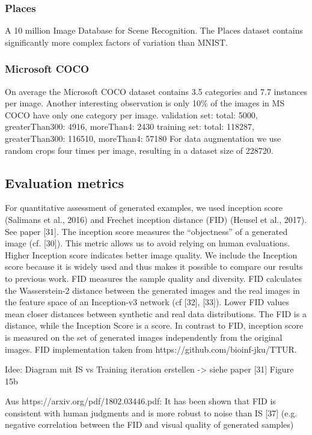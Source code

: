 \documentclass[12pt,a4paper]{article}
\begin{document}
\subsubsection{Places}
A 10 million Image Database for Scene Recognition. The Places dataset contains significantly more complex factors of variation than MNIST.

\subsubsection{Microsoft COCO}
On average the Microsoft COCO dataset \cite{1405.0312} contains 3.5 categories and 7.7 instances per image. Another interesting observation is only 10\% of the images in MS COCO have only one category per image.
validation set: total: 5000, greaterThan300: 4916, moreThan4: 2430
training set: total: 118287, greaterThan300: 116510, moreThan4: 57180
For data augmentation we use random crops four times per image, resulting in a dataset size of 228720.
    
\subsection{Evaluation metrics}
For quantitative assessment of generated examples, we used inception score (Salimans et al., 2016)
and Frechet inception distance (FID) (Heusel et al., 2017). See paper [31]. The inception score measures the “objectness” of a generated image (cf. [30]). This metric allows us to avoid relying on human evaluations. Higher Inception score indicates better image quality. We include the Inception score because it is widely used and thus makes it
possible to compare our results to previous work. FID measures the sample quality and diversity. FID calculates the Wasserstein-2 distance between the generated images and the real images in the feature space of an Inception-v3 network (cf [32], [33]). Lower FID values mean closer distances between synthetic and real data distributions. The FID is a distance, while the Inception Score is a score. In contrast to FID, inception score is
measured on the set of generated images independently from the original images.
FID implementation taken from https://github.com/bioinf-jku/TTUR.

Idee: Diagram mit IS vs Training iteration erstellen -> siehe paper [31] Figure 15b

Aus https://arxiv.org/pdf/1802.03446.pdf: It has been shown that FID is consistent with human judgments and is more robust to noise than IS [37] (e.g. negative correlation between the FID and visual quality of generated samples)
\end{document}
